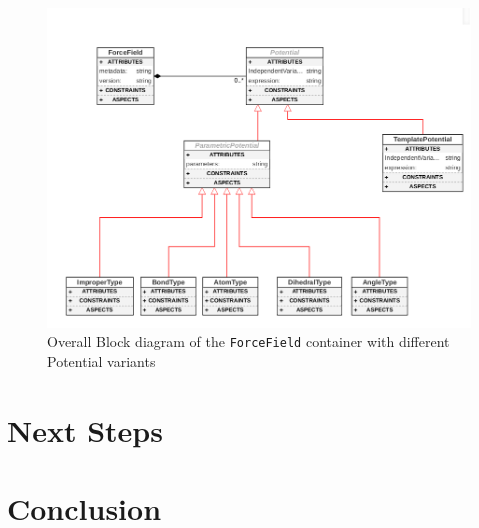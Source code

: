 \documentclass[12pt]{article}
\begin{document}
\begin{figure}[ht]
    \centering
    \includegraphics[width=\textwidth]{docs/pot}
    \caption{Overall Block diagram of the \texttt{ForceField} container with different Potential variants}
    \label{fig:FFDiagram}
\end{figure}

\section{Next Steps}
\section{Conclusion}
\end{document}
